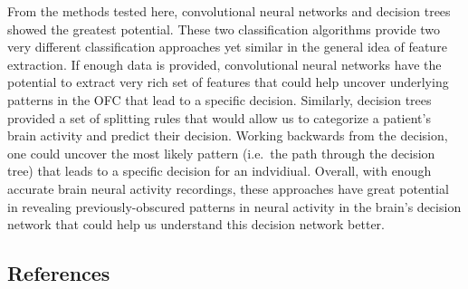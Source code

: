 \documentclass[11pt]{article}
\begin{document}
From the methods tested here, convolutional neural networks and decision
trees showed the greatest potential. These two classification algorithms
provide two very different classification approaches yet similar in the
general idea of feature extraction. If enough data is provided,
convolutional neural networks have the potential to extract very rich
set of features that could help uncover underlying patterns in the OFC
that lead to a specific decision. Similarly, decision trees provided a
set of splitting rules that would allow us to categorize a patient's
brain activity and predict their decision. Working backwards from the
decision, one could uncover the most likely pattern (i.e.~the path
through the decision tree) that leads to a specific decision for an
indvidiual. Overall, with enough accurate brain neural activity
recordings, these approaches have great potential in revealing
previously-obscured patterns in neural activity in the brain's decision
network that could help us understand this decision network better.

    \hypertarget{references}{%
\subsection{References}\label{references}}
\end{document}

